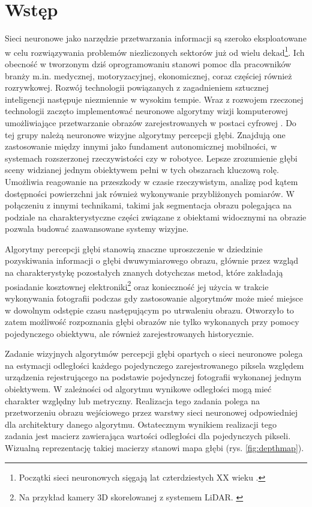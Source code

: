 \chapter{Wstęp}\label{chap:wstęp}

Sieci neuronowe jako narzędzie przetwarzania informacji są szeroko eksploatowane w celu rozwiązywania problemów niezliczonych sektorów już od wielu dekad\footnote{Początki sieci neuronowych sięgają lat czterdziestych XX wieku \cite{mccullochpitts1943}.}. Ich obecność w tworzonym dziś oprogramowaniu stanowi pomoc dla pracowników branży m.in. medycznej, motoryzacyjnej, ekonomicznej, coraz częściej również rozrywkowej. Rozwój technologii powiązanych z zagadnieniem sztucznej inteligencji następuje niezmiennie w wysokim tempie. Wraz z rozwojem rzeczonej technologii zaczęto implementować neuronowe algorytmy wizji komputerowej umożliwiające przetwarzanie obrazów zarejestrowanych w postaci cyfrowej \cite{tadeusiewiczflasinski1991}. Do tej grupy należą neuronowe wizyjne algorytmy percepcji głębi. Znajdują one zastosowanie między innymi jako fundament autonomicznej mobilności, w systemach rozszerzonej rzeczywistości czy w robotyce. Lepsze zrozumienie głębi sceny widzianej jednym obiektywem pełni w tych obszarach kluczową rolę. Umożliwia reagowanie na przeszkody w czasie rzeczywistym, analizę pod kątem dostępności powierzchni jak również wykonywanie przybliżonych pomiarów. W połączeniu z innymi technikami, takimi jak segmentacja obrazu \cite{minaee2021} polegająca na podziale na charakterystyczne części związane z obiektami widocznymi na obrazie pozwala budować zaawansowane systemy wizyjne.

Algorytmy percepcji głębi stanowią znaczne uproszczenie w dziedzinie pozyskiwania informacji o głębi dwuwymiarowego obrazu, głównie przez wzgląd na charakterystykę pozostałych znanych dotychczas metod, które zakładają posiadanie kosztownej elektroniki\footnote{Na przykład kamery 3D skorelowanej z systemem LiDAR. \cite{dubik1989}} oraz konieczność jej użycia w trakcie wykonywania fotografii podczas gdy zastosowanie algorytmów może mieć miejsce w dowolnym odstępie czasu następującym po utrwaleniu obrazu. Otworzyło to zatem możliwość rozpoznania głębi obrazów nie tylko wykonanych przy pomocy pojedynczego obiektywu, ale również zarejestrowanych historycznie.

Zadanie wizyjnych algorytmów percepcji głębi opartych o sieci neuronowe polega na estymacji odległości każdego pojedynczego zarejestrowanego piksela względem urządzenia rejestrującego na podstawie pojedynczej fotografii wykonanej jednym obiektywem. W zależności od algorytmu wynikowe odległości mogą mieć charakter względny lub metryczny. Realizacja tego zadania polega na przetworzeniu obrazu wejściowego przez warstwy sieci neuronowej odpowiedniej dla architektury danego algorytmu. Ostatecznym wynikiem realizacji tego zadania jest macierz zawierająca wartości odległości dla pojedynczych pikseli. Wizualną reprezentację takiej macierzy stanowi mapa głębi (rys. \ref{fig:depthmap}).

